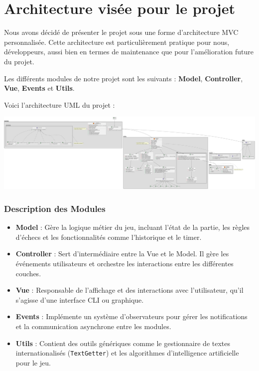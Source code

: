 \documentclass{article}
\begin{document}
\section{Architecture visée pour le projet}
Nous avons décidé de présenter le projet sous une forme d'architecture MVC personnalisée. Cette architecture est particulièrement pratique pour nous, développeurs, aussi bien en termes de maintenance que pour l'amélioration future du projet.

Les différents modules de notre projet sont les suivants : \textbf{Model}, \textbf{Controller}, \textbf{Vue}, \textbf{Events} et \textbf{Utils}. 

Voici l'architecture UML du projet : 

\begin{center}
    \includegraphics[width=\textwidth,height=\textheight,keepaspectratio]{archiUML}
\end{center}




\subsubsection{Description des Modules}

\begin{itemize}
    \item \textbf{Model} : Gère la logique métier du jeu, incluant l'état de la partie, les règles d'échecs et les fonctionnalités comme l'historique et le timer.
    \item \textbf{Controller} : Sert d'intermédiaire entre la Vue et le Model. Il gère les événements utilisateurs et orchestre les interactions entre les différentes couches.
    \item \textbf{Vue} : Responsable de l'affichage et des interactions avec l'utilisateur, qu'il s'agisse d'une interface CLI ou graphique.
    \item \textbf{Events} : Implémente un système d'observateurs pour gérer les notifications et la communication asynchrone entre les modules.
    \item \textbf{Utils} : Contient des outils génériques comme le gestionnaire de textes internationalisés (\texttt{TextGetter}) et les algorithmes d'intelligence artificielle pour le jeu.
\end{itemize}
\end{document}

